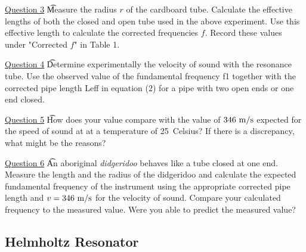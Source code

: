 \documentclass[11pt]{NSF}
\begin{document}
\underline{Question 3} \t  Measure the radius $r$ of the cardboard tube. Calculate the effective lengths of both the closed and open
tube used in the above experiment. Use this effective length to calculate the corrected frequencies $f$. Record these values under "Corrected $f$" in Table 1.

\underline{Question 4} \t Determine experimentally the velocity of sound with the resonance tube. Use the observed value
of the fundamental frequency f1 together with the corrected pipe length Leff in equation (2) for a
pipe with two open ends or one end closed. 

\underline{Question 5} \t How does your value compare with the value of 
$346~{\rm m/s}$ expected for the speed of sound at
at a temperature of 25~Celsius?
If there is a discrepancy, what might be the reasons?


\underline{Question 6} \t  An aboriginal {\em didgeridoo} behaves like a tube closed at one end.
Measure the length and the radius of the didgeridoo and calculate the expected fundamental frequency of the instrument
using the appropriate corrected pipe length and $v=346~{\rm m/s}$
for the velocity of sound. Compare your calculated frequency to the measured value. Were you able to predict the measured value?
\pagebreak
\subsection{Helmholtz Resonator}
\end{document}
